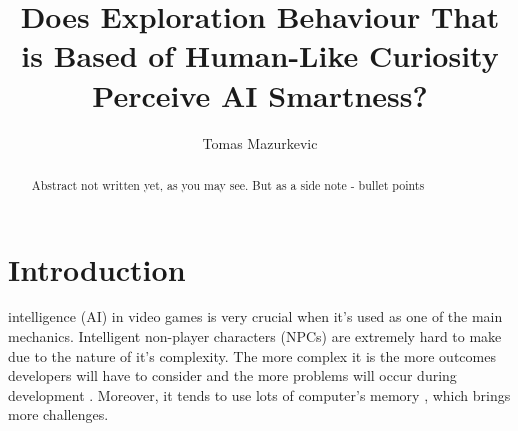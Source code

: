 \documentclass[journal]{IEEEtran}
\begin{document}
%
\title{Does Exploration Behaviour That is Based of Human-Like Curiosity Perceive AI Smartness?}
%
%
\author{Tomas Mazurkevic}


\maketitle

\begin{abstract}
Abstract not written yet, as you may see. But as a side note - bullet points 
\end{abstract}

\section{Introduction}
% 
% 
% 
% 
 intelligence (AI) in video games is very crucial when it's used as one of the main mechanics. Intelligent non-player characters (NPCs) are extremely hard to make due to the nature of it's complexity. The more complex it is the more outcomes developers will have to consider and the more problems will occur during development \cite{gdchalo2}. Moreover, it tends to use lots of computer's memory \cite{gdchalo2}, which brings more challenges.
\end{document}
